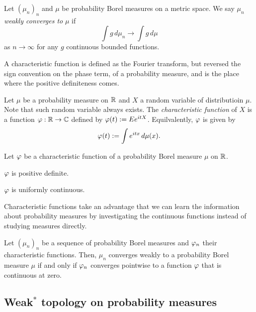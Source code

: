 \documentclass[12pt]{article}
\begin{document}
\begin{defn}
Let $(\mu_n)_n$ and $\mu$ be probability Borel measures on a metric space.
We say $\mu_n$ \emph{weakly converges to} $\mu$ if
\[\int g\,d\mu_n\to\int g\,d\mu\]
as $n\to\infty$ for any $g$ continuous bounded functions.
\end{defn}

A characteristic function is defined as the Fourier transform, but reversed the sign convention on the phase term, of a probability measure, and is the place where the positive definiteness comes.

\begin{defn}
Let $\mu$ be a probability measure on $\mathbb{R}$ and $X$ a random variable of distributioin $\mu$.
Note that such random variable always exists.
The \emph{characteristic function} of $X$ is a function $\varphi:\mathbb{R}\to\mathbb{C}$ defined by $\varphi(t):=Ee^{itX}$.
Equilvalently, $\varphi$ is given by
\[\varphi(t):=\int e^{itx}\,d\mu(x).\]
\end{defn}
\begin{prop}
Let $\varphi$ be a characteristic function of a probability Borel measure $\mu$ on $\mathbb{R}$.
\begin{parts}
\item $\varphi$ is positive definite.
\item $\varphi$ is uniformly continuous.
\end{parts}
\end{prop}
\begin{pf}
\end{pf}

Characteristic functions take an advantage that we can learn the information about probability measures by investigating the continuous functions instead of studying measures directly.



\begin{thm}
Let $(\mu_n)_n$ be a sequence of probability Borel measures and $\varphi_n$ their characteristic functions.
Then, $\mu_n$ converges weakly to a probability Borel measure $\mu$ if and only if $\varphi_n$ converges pointwise to a function $\varphi$ that is continuous at zero.
\end{thm}
\begin{pf}
\end{pf}



\subsection{Weak$^*$ topology on probability measures}
\end{document}
